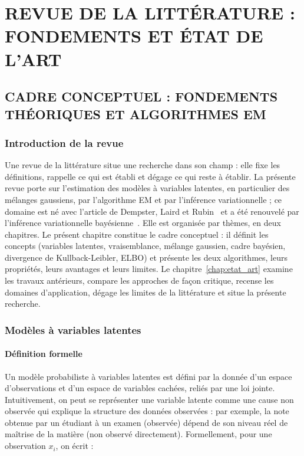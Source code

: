 



\part{REVUE DE LA LITTÉRATURE : FONDEMENTS ET ÉTAT DE L'ART}

\chapter{CADRE CONCEPTUEL : FONDEMENTS THÉORIQUES ET ALGORITHMES EM}\label{chap:fondements}
\section{Introduction de la revue}\label{sec:intro_revue}
Une revue de la littérature situe une recherche dans son champ : elle fixe les définitions, rappelle ce qui est établi et dégage ce qui reste à établir. La présente revue porte sur l'estimation des modèles à variables latentes, en particulier des mélanges gaussiens, par l'algorithme EM et par l'inférence variationnelle ; ce domaine est né avec l'article de Dempster, Laird et Rubin~\cite{dempster1977} et a été renouvelé par l'inférence variationnelle bayésienne~\cite{jordan1999,attias2000,bishop2006}. Elle est organisée par thèmes, en deux chapitres. Le présent chapitre constitue le cadre conceptuel : il définit les concepts (variables latentes, vraisemblance, mélange gaussien, cadre bayésien, divergence de Kullback-Leibler, ELBO) et présente les deux algorithmes, leurs propriétés, leurs avantages et leurs limites. Le chapitre~\ref{chap:etat_art} examine les travaux antérieurs, compare les approches de façon critique, recense les domaines d'application, dégage les limites de la littérature et situe la présente recherche.

\section{Modèles à variables latentes}\label{sec:modeles_a_variables_latentes}
\subsection{Définition formelle}\label{sec:definition_formelle}
Un modèle probabiliste à variables latentes est défini par la donnée d'un espace d'observations et d'un espace de variables cachées, reliés par une loi jointe. Intuitivement, on peut se représenter une variable latente comme une cause non observée qui explique la structure des données observées : par exemple, la note obtenue par un étudiant à un examen (observée) dépend de son niveau réel de maîtrise de la matière (non observé directement). Formellement, pour une observation $x_{i}$, on écrit :

